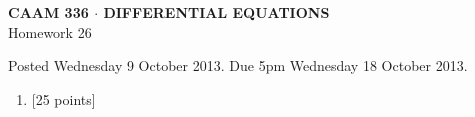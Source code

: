 \documentclass[10pt]{article}
\begin{document}
\vspace*{-5em}
\begin{center}
\large \textsf{\textbf{CAAM 336 $\cdot$ DIFFERENTIAL EQUATIONS}\\[0.5em]
Homework 26 }
\end{center}

Posted Wednesday 9 October 2013.  Due 5pm Wednesday 18 October 2013.

\begin{enumerate}\addtocounter{enumi}{25}
\item {[25 points]}  
\end{enumerate}
\end{document}

